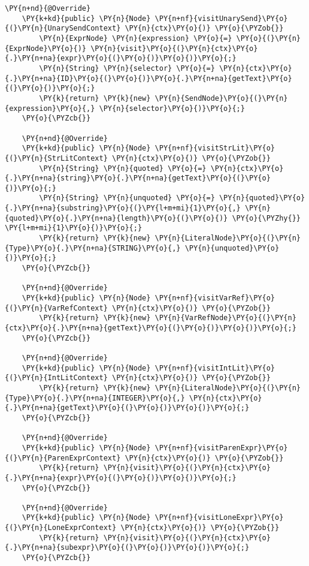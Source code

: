 \begin{Verbatim}[commandchars=\\\{\}]
    \PY{n+nd}{@Override}
    \PY{k+kd}{public} \PY{n}{Node} \PY{n+nf}{visitUnarySend}\PY{o}{(}\PY{n}{UnarySendContext} \PY{n}{ctx}\PY{o}{)} \PY{o}{\PYZob{}}
        \PY{n}{ExprNode} \PY{n}{expression} \PY{o}{=} \PY{o}{(}\PY{n}{ExprNode}\PY{o}{)} \PY{n}{visit}\PY{o}{(}\PY{n}{ctx}\PY{o}{.}\PY{n+na}{expr}\PY{o}{(}\PY{o}{)}\PY{o}{)}\PY{o}{;}
        \PY{n}{String} \PY{n}{selector} \PY{o}{=} \PY{n}{ctx}\PY{o}{.}\PY{n+na}{ID}\PY{o}{(}\PY{o}{)}\PY{o}{.}\PY{n+na}{getText}\PY{o}{(}\PY{o}{)}\PY{o}{;}
        \PY{k}{return} \PY{k}{new} \PY{n}{SendNode}\PY{o}{(}\PY{n}{expression}\PY{o}{,} \PY{n}{selector}\PY{o}{)}\PY{o}{;}
    \PY{o}{\PYZcb{}}

    \PY{n+nd}{@Override}
    \PY{k+kd}{public} \PY{n}{Node} \PY{n+nf}{visitStrLit}\PY{o}{(}\PY{n}{StrLitContext} \PY{n}{ctx}\PY{o}{)} \PY{o}{\PYZob{}}
        \PY{n}{String} \PY{n}{quoted} \PY{o}{=} \PY{n}{ctx}\PY{o}{.}\PY{n+na}{string}\PY{o}{.}\PY{n+na}{getText}\PY{o}{(}\PY{o}{)}\PY{o}{;}
        \PY{n}{String} \PY{n}{unquoted} \PY{o}{=} \PY{n}{quoted}\PY{o}{.}\PY{n+na}{substring}\PY{o}{(}\PY{l+m+mi}{1}\PY{o}{,} \PY{n}{quoted}\PY{o}{.}\PY{n+na}{length}\PY{o}{(}\PY{o}{)} \PY{o}{\PYZhy{}} \PY{l+m+mi}{1}\PY{o}{)}\PY{o}{;}
        \PY{k}{return} \PY{k}{new} \PY{n}{LiteralNode}\PY{o}{(}\PY{n}{Type}\PY{o}{.}\PY{n+na}{STRING}\PY{o}{,} \PY{n}{unquoted}\PY{o}{)}\PY{o}{;}
    \PY{o}{\PYZcb{}}

    \PY{n+nd}{@Override}
    \PY{k+kd}{public} \PY{n}{Node} \PY{n+nf}{visitVarRef}\PY{o}{(}\PY{n}{VarRefContext} \PY{n}{ctx}\PY{o}{)} \PY{o}{\PYZob{}}
        \PY{k}{return} \PY{k}{new} \PY{n}{VarRefNode}\PY{o}{(}\PY{n}{ctx}\PY{o}{.}\PY{n+na}{getText}\PY{o}{(}\PY{o}{)}\PY{o}{)}\PY{o}{;}
    \PY{o}{\PYZcb{}}

    \PY{n+nd}{@Override}
    \PY{k+kd}{public} \PY{n}{Node} \PY{n+nf}{visitIntLit}\PY{o}{(}\PY{n}{IntLitContext} \PY{n}{ctx}\PY{o}{)} \PY{o}{\PYZob{}}
        \PY{k}{return} \PY{k}{new} \PY{n}{LiteralNode}\PY{o}{(}\PY{n}{Type}\PY{o}{.}\PY{n+na}{INTEGER}\PY{o}{,} \PY{n}{ctx}\PY{o}{.}\PY{n+na}{getText}\PY{o}{(}\PY{o}{)}\PY{o}{)}\PY{o}{;}
    \PY{o}{\PYZcb{}}

    \PY{n+nd}{@Override}
    \PY{k+kd}{public} \PY{n}{Node} \PY{n+nf}{visitParenExpr}\PY{o}{(}\PY{n}{ParenExprContext} \PY{n}{ctx}\PY{o}{)} \PY{o}{\PYZob{}}
        \PY{k}{return} \PY{n}{visit}\PY{o}{(}\PY{n}{ctx}\PY{o}{.}\PY{n+na}{expr}\PY{o}{(}\PY{o}{)}\PY{o}{)}\PY{o}{;}
    \PY{o}{\PYZcb{}}

    \PY{n+nd}{@Override}
    \PY{k+kd}{public} \PY{n}{Node} \PY{n+nf}{visitLoneExpr}\PY{o}{(}\PY{n}{LoneExprContext} \PY{n}{ctx}\PY{o}{)} \PY{o}{\PYZob{}}
        \PY{k}{return} \PY{n}{visit}\PY{o}{(}\PY{n}{ctx}\PY{o}{.}\PY{n+na}{subexpr}\PY{o}{(}\PY{o}{)}\PY{o}{)}\PY{o}{;}
    \PY{o}{\PYZcb{}}


\end{Verbatim}

